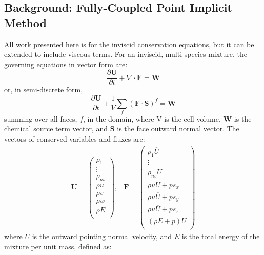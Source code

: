 \subsection{Background: Fully-Coupled Point Implicit Method}

All work presented here is for the inviscid conservation equations, but it can be
extended to include viscous terms.  For an inviscid, multi-species mixture, the
governing equations in vector form are:
\begin{equation}
	\label{inv_flux_vec}
	\frac{\partial \mathbf{U}}{\partial t}
	+ \nabla\cdot \mathbf{F} = \mathbf{W}
\end{equation}
 or, in semi-discrete form,
\begin{equation}
	\label{inv_flux_fv}
	\frac{\partial \mathbf{U}}{\partial t}
	 + \frac{1}{V}\sum\limits_{f}(\mathbf{F}\cdot\mathbf{S})^f = \mathbf{W}
 \end{equation}
summing over all faces, $f$, in the domain, where V is the cell volume, 
$\mathbf{W}$ is the chemical source term vector, and $\mathbf{S}$ is the face
outward normal vector.  The vectors of conserved variables and fluxes are:
\begin{equation}
	\begin{matrix}
	\mathbf{U}=\begin{pmatrix}
   		\rho_1\\
		\vdots \\
		\rho_{ns} \\
		\rho u \\
		\rho v \\
		\rho w \\
		\rho E \\
	\end{pmatrix},      &
 	\mathbf{F} = \begin{pmatrix}
		\rho_1  \overline{U} \\
		\vdots \\
		\rho_{ns} \overline{U} \\
		\rho u \overline{U} + p s_x\\
		\rho u \overline{U} + p s_y\\
		\rho u \overline{U} + p s_z\\
		(\rho E + p) \overline{U} \\
	\end{pmatrix}
	\end{matrix}
 \end{equation}
where $\overline{U}$ is the outward pointing normal velocity, and $E$ is
the total energy of the mixture per unit mass, defined as: 

